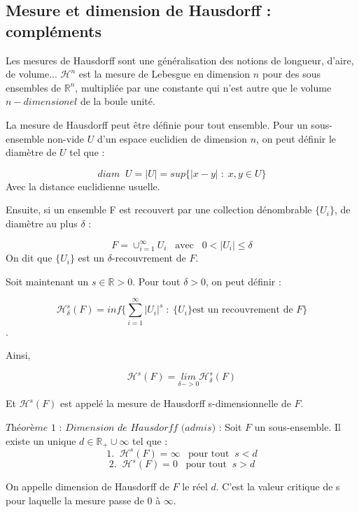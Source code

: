 \subsection{Mesure et dimension de Hausdorff : compléments}
Les mesures de Hausdorff sont une généralisation des notions de longueur, d'aire, de volume... $\mathcal{H}^n$ est la mesure de Lebesgue en dimension $n$ pour des sous ensembles de $\mathbb{R}^n$, multipliée par une constante qui n'est autre que le volume $n-dimensionel$ de la boule unité.

\bigskip

La mesure de Hausdorff peut être définie pour tout ensemble. Pour un sous-ensemble non-vide $U$ d'un espace euclidien de dimension $n$, on peut définir le diamètre de $U$ tel que : 

\[ diam \; \; U  =  |U| = sup\{ |x-y| \;  :  \; x,y \in U \}\] 
Avec la distance euclidienne usuelle.

\bigskip

Ensuite, si un ensemble F est recouvert par une collection dénombrable $\{U_i\}$, de diamètre au plus $\delta$ : 

\[ F = \cup_{i=1}^{\infty} U_i \; \; \; \text{avec}\; \; \; 0 < |U_i| \leq \delta  \]
 On dit que $\{U_i\}$ est un $\delta$-recouvrement de $F$.
 
\bigskip
 
Soit maintenant un $s \in \mathbb{R} >0 $. Pour tout $\delta >0$, on peut définir : 

\[ \mathcal{H}_{\delta}^s (F) = inf \{ \sum \limits_{i=1}^{\infty} |U_i|^s \; : \; \{U_i\} \text{est un recouvrement de } F\}\].

Ainsi, 

\[ \mathcal{H}^s (F) = \underset{\delta -> 0}{lim} \mathcal{H}_{\delta}^s (F)\] 

Et $\mathcal{H}^s (F)$ est appelé la mesure de Hausdorff s-dimensionnelle de $F$.

\bigskip

$\textit{Théorème 1 : Dimension de Hausdorff (admis)}$ : Soit $F$ un sous-ensemble. Il existe un unique  $d \in \mathbb{R}_{+} \cup {\infty}$ tel que : 
\[ 1. \; \; \mathcal{H}^s (F) = \infty \; \; \; \text{pour tout} \; \;  s<d \] 
\[ 2. \; \; \mathcal{H}^s (F) = 0 \; \; \; \text{pour tout} \; \; s>d \] 

On appelle dimension de Hausdorff de $F$ le réel $d$. C'est la valeur critique de s pour laquelle la mesure passe de $0$ à $\infty$.

\bigskip

